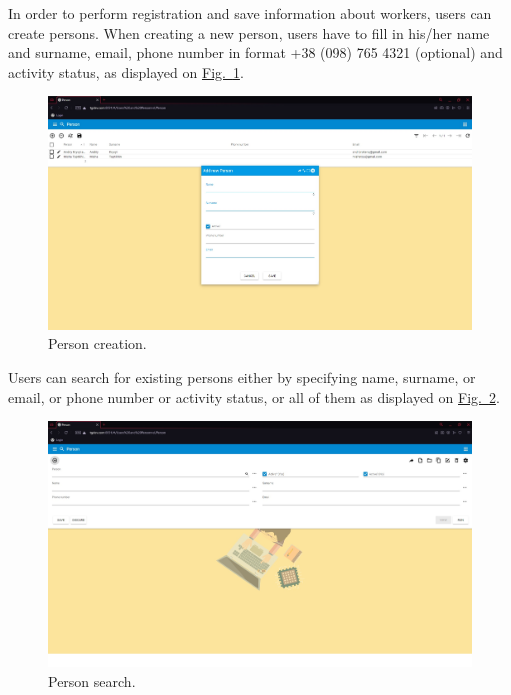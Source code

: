 In order to perform registration and save information about workers, users can create persons. When creating a new person, users have to fill in his/her name and surname, email, phone number in format +38 (098) 765 4321 (optional) and activity status, as displayed on \hyperref[sections/personnel/images/fig2]{Fig.~\ref*{sections/personnel/images/fig2}}.

\begin{figure}[!htbp]
\centering
\includegraphics[width=0.95\linewidth]{sections/personnel/images/fig2.jpg}
\caption{Person creation.}\label{sections/personnel/images/fig2}
\end{figure}

\newpage
Users can search for existing persons either by specifying name, surname, or email, or phone number or activity status, or all of them as displayed on \hyperref[sections/personnel/images/fig1]{Fig.~\ref*{sections/personnel/images/fig1}}.

\begin{figure}[!htbp]
\centering
\includegraphics[width=0.95\linewidth]{sections/personnel/images/fig1.jpg}
\caption{Person search.}\label{sections/personnel/images/fig1}
\end{figure}

